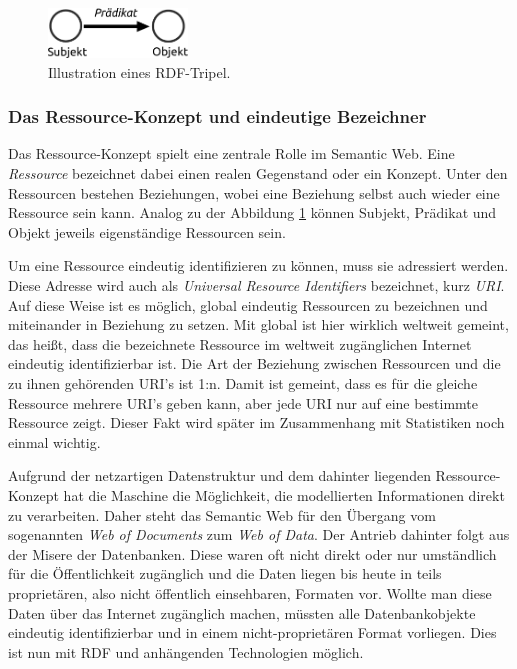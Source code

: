 \documentclass[11pt]{article}
\newcommand{\com}[1]{\marginpar{\em {\small{#1}}}} %
\begin{document}
%
%
\begin{figure}[h!]
    \centering
    \includegraphics[width=3.7cm]{SemanticWeb_Triple.pdf}
    \caption{Illustration eines RDF-Tripel.}
    \label{fig:SemanticWeb_Triple}
\end{figure}

%
%
\subsubsection{Das Ressource-Konzept und eindeutige Bezeichner} 

Das Ressource-Konzept spielt eine zentrale Rolle im Semantic Web. Eine \textit{Ressource}\com{Ressource} bezeichnet dabei einen realen Gegenstand oder ein Konzept. Unter den Ressourcen bestehen Beziehungen, wobei eine Beziehung selbst auch wieder eine Ressource sein kann. Analog zu der Abbildung \ref{fig:SemanticWeb_Triple} können Subjekt, Prädikat und Objekt jeweils eigenständige Ressourcen sein.

Um eine Ressource eindeutig identifizieren zu können, muss sie adressiert werden. Diese Adresse wird auch als \textit{Universal Resource Identifiers} bezeichnet, kurz \textit{URI}\com{URI}. Auf diese Weise ist es möglich, global eindeutig Ressourcen zu bezeichnen und miteinander in Beziehung zu setzen. Mit global ist hier wirklich weltweit gemeint, das heißt, dass die bezeichnete Ressource im weltweit zugänglichen Internet eindeutig identifizierbar ist. Die Art der Beziehung zwischen Ressourcen und die zu ihnen gehörenden URI's ist 1:n. Damit ist gemeint, dass es für die gleiche Ressource mehrere URI's geben kann, aber jede URI nur auf eine bestimmte Ressource zeigt. Dieser Fakt wird später im Zusammenhang mit Statistiken noch einmal wichtig.

Aufgrund der netzartigen Datenstruktur und dem dahinter liegenden Ressource-Konzept hat die Maschine die Möglichkeit, die modellierten Informationen direkt zu verarbeiten. Daher steht das Semantic Web für den Übergang vom sogenannten \textit{Web of Documents}\com{Web of \\ Documents \\ \\ Web of \\ Data} zum \textit{Web of Data}. Der Antrieb dahinter folgt aus der Misere der Datenbanken. Diese waren oft nicht direkt oder nur umständlich für die Öffentlichkeit zugänglich und die Daten liegen bis heute in teils proprietären, also nicht öffentlich einsehbaren, Formaten vor. Wollte man diese Daten über das Internet zugänglich machen, müssten alle Datenbankobjekte eindeutig identifizierbar und in einem nicht-proprietären Format vorliegen. Dies ist nun mit RDF und anhängenden Technologien möglich. \cite[S. 3]{SEMA-WEB-ABOUT} \\
\end{document}
